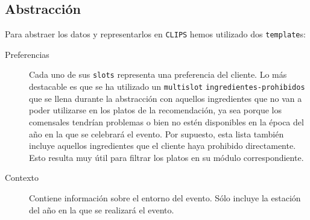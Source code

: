 \subsection{Abstracción}
Para abstraer los datos y representarlos en \texttt{CLIPS} hemos utilizado dos \texttt{template}s:

\begin{description}
\item[Preferencias] Cada uno de sus \texttt{slots} representa una preferencia del cliente. Lo más destacable es que se ha utilizado un
 \texttt{multislot} \texttt{ingredientes-prohibidos} que se llena durante la abstracción con aquellos ingredientes que no van a
poder utilizarse en los platos de la recomendación, ya sea porque los comensales tendrían problemas o bien no estén disponibles en la
época del año en la que se celebrará el evento. Por supuesto, esta lista también incluye aquellos ingredientes que el cliente haya
prohibido directamente. Esto resulta muy útil para filtrar los platos en su módulo correspondiente.
\item[Contexto] Contiene información sobre el entorno del evento. Sólo incluye la estación del año en la que se realizará el evento.
\end{description}
